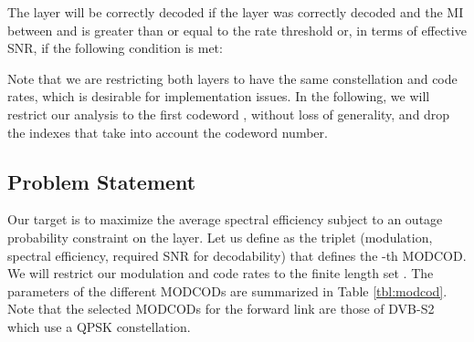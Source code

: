 \documentclass[journal,onecolumn,10pt,a4paper]{IEEEtran}
\begin{document}
The  layer will be correctly decoded if the  layer was correctly decoded and the MI between  and  is greater than or equal to the rate threshold or, in terms of effective SNR, if the following condition is met:


Note that we are restricting both layers to have the same constellation and code rates, which is desirable for implementation issues. In the following, we will restrict our analysis to the first codeword , without loss of generality, and drop the indexes that take into account the codeword number.

\subsection{Problem Statement}

Our target is to maximize the average spectral efficiency subject to an outage probability constraint on the  layer. Let us define  as the triplet (modulation, spectral efficiency, required SNR for decodability) that defines the -th MODCOD. We will restrict our modulation and code rates to the finite length set . The parameters of the different MODCODs are summarized in Table \ref{tbl:modcod}. Note that the selected MODCODs for the forward link are those of DVB-S2 which use a QPSK constellation.
\end{document}
